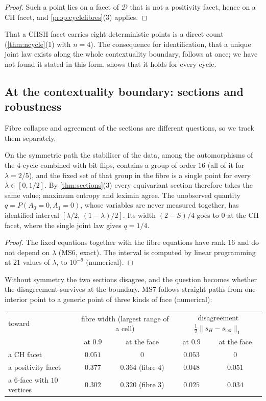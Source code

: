 \documentclass[11pt]{article}
\theoremstyle{definition}\newtheorem{definition}[theorem]{Definition}\newtheorem{remark}[theorem]{Remark}\newtheorem{example}[theorem]{Example}\newtheorem{problem}[theorem]{Open problem}\crefname{problem}{Problem}{Problems}
\begin{document}
\begin{proof}
Such a point lies on a facet of $\mathcal D$ that is not a positivity facet, hence on a CH facet, and \cref{prop:cyclefibres}(3) applies.
\end{proof}

That a CHSH facet carries eight deterministic points is a direct count (\cref{thm:ncycle}(1) with $n=4$). The consequence for identification, that a unique joint law exists along the whole contextuality boundary, follows at once; we have not found it stated in this form.  shows that it holds for every cycle.

\subsection{At the contextuality boundary: sections and robustness}\label{sec:cycleboundary}
Fibre collapse and agreement of the sections are different questions, so we track them separately.

\begin{proposition}\label{prop:chshpath}
On the symmetric path the stabiliser of the data, among the automorphisms of the 4-cycle combined with bit flips, contains a group of order $16$ (all of it for $\lambda=2/5$), and the fixed set of that group in the fibre is a single point for every $\lambda\in[0,1/2]$. By \cref{thm:sections}(3) every equivariant section therefore takes the same value; maximum entropy and leximin agree. The unobserved quantity $q=P(A_0=0,A_1=0)$, whose variables are never measured together, has identified interval $[\lambda/2,\,(1-\lambda)/2]$. Its width $(2-S)/4$ goes to $0$ at the CH facet, where the single joint law gives $q=1/4$.
\end{proposition}

\begin{proof}
The fixed equations together with the fibre equations have rank $16$ and do not depend on $\lambda$ (MS6, exact). The interval is computed by linear programming at $21$ values of $\lambda$, to $10^{-9}$ (numerical).
\end{proof}

Without symmetry the two sections disagree, and the question becomes whether the disagreement survives at the boundary. MS7 follows straight paths from one interior point to a generic point of three kinds of face (numerical):

\begin{center}\small
\begin{tabular}{lcccc}\toprule
toward & \multicolumn{2}{c}{fibre width (largest range of a cell)} & \multicolumn{2}{c}{disagreement $\tfrac12\|s_H-s_{\mathrm{lex}}\|_1$}\\
& at $0.9$ & at the face & at $0.9$ & at the face\\\midrule
a CH facet & $0.051$ & $0$ & $0.053$ & $0$\\
a positivity facet & $0.377$ & $0.364$ (fibre $4$) & $0.048$ & $0.051$\\
a $6$-face with $10$ vertices & $0.302$ & $0.320$ (fibre $3$) & $0.025$ & $0.034$\\\bottomrule
\end{tabular}
\end{center}
\end{document}
